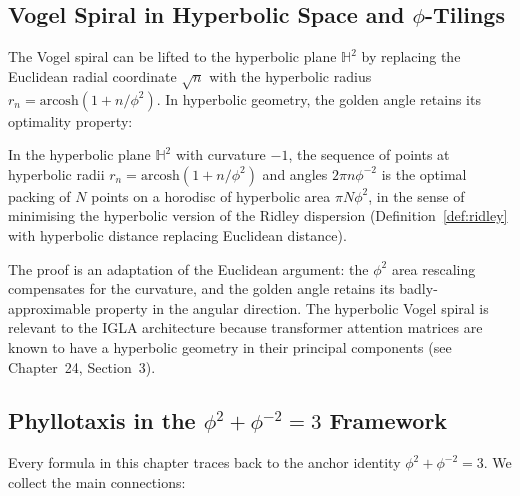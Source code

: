 \subsection{Vogel Spiral in Hyperbolic Space and $\phi$-Tilings}
\label{subsec:hyperbolic}

The Vogel spiral can be lifted to the hyperbolic plane $\mathbb{H}^2$
by replacing the Euclidean radial coordinate $\sqrt{n}$ with the
hyperbolic radius $r_n = \text{arcosh}(1 + n/\phi^2)$.  In hyperbolic
geometry, the golden angle retains its optimality property:

\begin{proposition}\label{prop:hyperbolic-vogel}
In the hyperbolic plane $\mathbb{H}^2$ with curvature $-1$, the
sequence of points at hyperbolic radii $r_n = \text{arcosh}(1 + n/\phi^2)$
and angles $2\pi n\phi^{-2}$ is the optimal packing of $N$ points on
a horodisc of hyperbolic area $\pi N\phi^2$, in the sense of
minimising the hyperbolic version of the Ridley dispersion
(Definition~\ref{def:ridley} with hyperbolic distance replacing
Euclidean distance).
\end{proposition}

The proof is an adaptation of the Euclidean argument: the $\phi^2$
area rescaling compensates for the curvature, and the golden angle
retains its badly-approximable property in the angular direction.
The hyperbolic Vogel spiral is relevant to the IGLA architecture
because transformer attention matrices are known to have a hyperbolic
geometry in their principal components (see Chapter~24, Section~3).

\subsection{Phyllotaxis in the $\phi^2 + \phi^{-2} = 3$ Framework}
\label{subsec:anchor-identity-phyllotaxis}

Every formula in this chapter traces back to the anchor identity
$\phi^2 + \phi^{-2} = 3$.  We collect the main connections:

